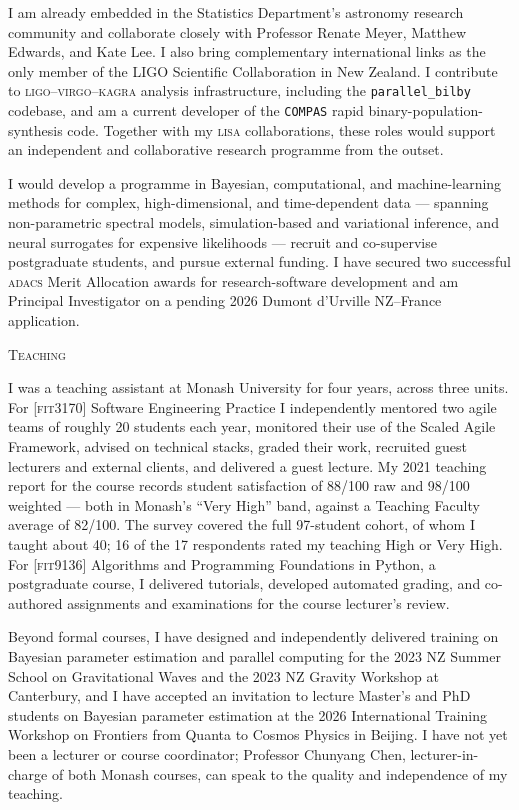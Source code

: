 \documentclass[a4paper,11pt]{article}
\newcommand{\coursecode}[1]{\textsc{[#1]}}
\newcommand{\acronym}[1]{\textsc{#1}}
\newcommand{\software}[1]{\texttt{#1}}
\newcommand{\block}[1]{%
    \vspace{0.55em}%
    {\color{color-title}\scshape #1}\par
    \vspace{-0.35em}}
\begin{document}
I am already embedded in the Statistics Department's astronomy research community and
collaborate closely with Professor Renate Meyer, Matthew Edwards, and Kate Lee.
I also bring complementary international links as the only member of the LIGO
Scientific Collaboration in New Zealand. I contribute to
\acronym{ligo--virgo--kagra} analysis infrastructure, including the
\software{parallel\_bilby} codebase, and am a current developer of the
\software{COMPAS} rapid binary-population-synthesis code. Together with my
\acronym{lisa} collaborations, these roles would support an independent and
collaborative research programme from the outset.

I would develop a programme in Bayesian, computational, and machine-learning
methods for complex, high-dimensional, and time-dependent data --- spanning
non-parametric spectral models, simulation-based and variational inference, and
neural surrogates for expensive likelihoods --- recruit and co-supervise
postgraduate students, and pursue external funding. I have secured two
successful \acronym{adacs} Merit Allocation awards for research-software
development and am Principal Investigator on a pending 2026 Dumont d'Urville
NZ--France application.

\block{Teaching}

I was a teaching assistant at Monash University for four years, across three
units. For
\coursecode{fit3170} Software Engineering Practice I independently mentored two
agile teams of roughly 20 students each year, monitored their use of the Scaled
Agile Framework, advised on technical stacks, graded their work, recruited
guest lecturers and external clients, and delivered a guest lecture. My 2021
teaching report for the course records student satisfaction of 88/100 raw and
98/100 weighted --- both in Monash's ``Very High'' band, against a Teaching
Faculty average of 82/100. The survey covered the full 97-student cohort, of
whom I taught about 40; 16 of the 17 respondents rated my teaching High or Very
High. For \coursecode{fit9136} Algorithms and Programming Foundations in
Python, a postgraduate course, I delivered tutorials, developed automated
grading, and co-authored assignments and examinations for the course lecturer's
review.

Beyond formal courses, I have designed and independently delivered training on
Bayesian parameter estimation and parallel computing for the 2023 NZ Summer
School on Gravitational Waves and the 2023 NZ Gravity Workshop at Canterbury,
and I have accepted an invitation to lecture Master's and PhD students on
Bayesian parameter estimation at the 2026 International Training Workshop on
Frontiers from Quanta to Cosmos Physics in Beijing. I have not yet been a
lecturer or course coordinator; Professor Chunyang Chen,
lecturer-in-charge of both Monash courses, can speak to the quality and
independence of my teaching.
\end{document}
